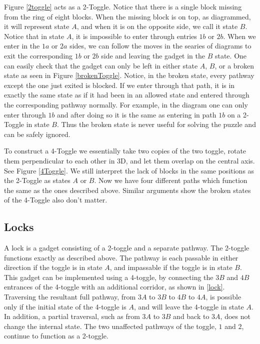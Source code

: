 \documentclass[11pt]{article}
\begin{document}
Figure \ref{2toggle} acts as a 2-Toggle. Notice that there is a single block missing from the ring of eight blocks. When the missing block is on top, as diagrammed, it will represent state $A$, and when it is on the opposite side, we call it state $B$. Notice that in state $A$, it is impossible to enter through entries $1b$ or $2b$. When we enter in the $1a$ or $2a$ sides, we can follow the moves in the searies of diagrams to exit the corresponding $1b$ or $2b$ side and leaving the gadget in the $B$ state. One can easily check that the gadget can only be left in either state $A$, $B$, or a broken state as seen in Figure \ref{brokenToggle}. Notice, in the broken state, every pathway except the one just exited is blocked. If we enter through that path, it is in exactly the same state as if it had been in an allowed state and entered through the corresponding pathway normally. For example, in the diagram one can only enter through $1b$ and after doing so it is the same as entering in path $1b$ on a 2-Toggle in state $B$. Thus the broken state is never useful for solving the puzzle and can be safely ignored.

To construct a 4-Toggle we essentially take two copies of the two toggle, rotate them perpendicular to each other in 3D, and let them overlap on the central axis. See Figure \ref{4Toggle}. We still interpret the lack of blocks in the same positions as the 2-Toggle as states $A$ or $B$. Now we have four different paths which function the same as the ones described above. Similar arguments show the broken states of the 4-Toggle also don't matter.

\subsection{Locks}

A lock is a gadget consisting of a 2-toggle and a separate pathway. The 2-toggle functions exactly
as described above. The pathway is each passable in either direction if the toggle is in state $A$,
and impassable if the toggle is in state $B$. This gadget can be implemented using a 4-toggle, by
connecting the $3B$ and $4B$ entrances of the 4-toggle with an additional corridor, as shown in \ref{lock}.
Traversing the resultant full pathway, from $3A$ to $3B$ to $4B$ to $4A$, is possible only if the initial
state of the 4-toggle is $A$, and will leave the 4-toggle in state $A$. In addition, a partial traversal,
such as from $3A$ to $3B$ and back to $3A$, does not change the internal state. The two unaffected
pathways of the toggle, $1$ and $2$, continue to function as a 2-toggle.
\end{document}
